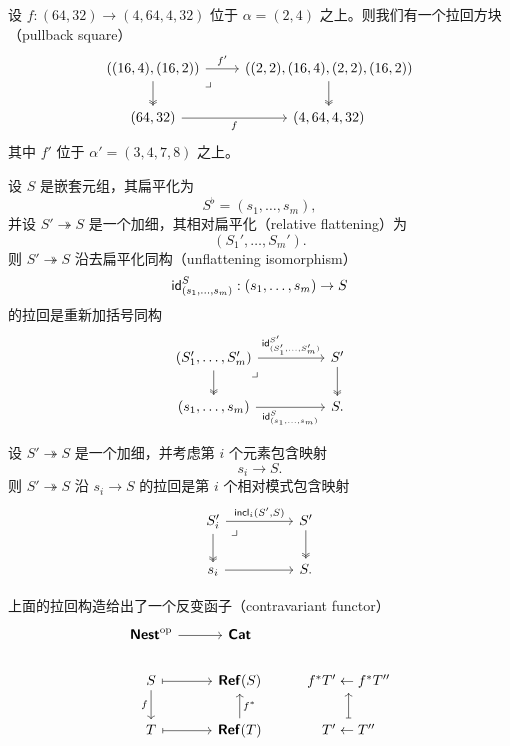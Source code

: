 \begin{example}
    设 $f:(64,32) \to (4,64,4,32)$ 位于 $\alpha = (2,4)$ 之上。则我们有一个拉回方块（pullback square）
    \[ \begin{tikzcd} 
    ((16,4),(16,2)) \ar[d,two heads] \ar[r,"f'"] \arrow[dr, phantom, "\lrcorner", very near start] & ((2,2),(16,4),(2,2),(16,2)) \ar[d, two heads] \\
    (64,32) \ar[r,swap,"f"] & (4,64,4,32) 
    \end{tikzcd} \]
    其中 $f'$ 位于 $\alpha' = (3,4,7,8)$ 之上。
\end{example}

\begin{example}
    设 $S$ 是嵌套元组，其扁平化为
    \[
    S^\flat = (s_1,\dots,s_m),
    \]
    并设 $S' \twoheadrightarrow S$ 是一个加细，其相对扁平化（relative flattening）为
    \[
    (S_1',\dots,S_m').
    \]
    则 $S' \twoheadrightarrow S$ 沿去扁平化同构（unflattening isomorphism）
    \[
    \mathsf{id}_{(s_1,\dots,s_m)}^S :(s_1,\dots,s_m) \to S 
    \]
    的拉回是重新加括号同构
    \[ \begin{tikzcd} 
    (S_1',\dots,S_m') \ar[rr,"\id_{(S_1'{,}\dots{,}S_m')}^{S'}"] \ar[d, two heads] \arrow[drr, phantom, "\lrcorner", very near start] & & S' \ar[d,two heads] \\
    (s_1,\dots,s_m) \ar[rr,swap,"\id_{(s_1{,}\dots{,}s_m)}^S"] & & S.
    \end{tikzcd}
    \]
\end{example}

\begin{example}
    设 $S' \twoheadrightarrow S$ 是一个加细，并考虑第 $i$ 个元素包含映射
    \[
    s_i \to S.
    \]
    则 $S' \twoheadrightarrow S$ 沿 $s_i \to S$ 的拉回是第 $i$ 个相对模式包含映射
        \[ \begin{tikzcd} 
    S_i' \ar[rr,"\incl_i(S'{,}S)"] \ar[d, two heads] \arrow[drr, phantom, "\lrcorner", very near start] & & S' \ar[d,two heads] \\
    s_i \ar[rr,swap] & & S.
    \end{tikzcd}
    \]
\end{example}

\begin{observation}
    上面的拉回构造给出了一个反变函子（contravariant functor）
    \[ \begin{tikzcd} 
\catstyle{Nest}^\text{op} \ar[r] & \catstyle{Cat} \\
    S \ar[r,mapsto] \ar[d,swap,"f"] & \catstyle{Ref}(S)  & f^*T' \leftarrow f^*T'' \\
    T \ar[r,mapsto]  & \catstyle{Ref}(T) \ar[u,swap,"f^*"] & T' \leftarrow T'' \ar[u,mapsto] 
    \end{tikzcd} \]
\end{observation}

